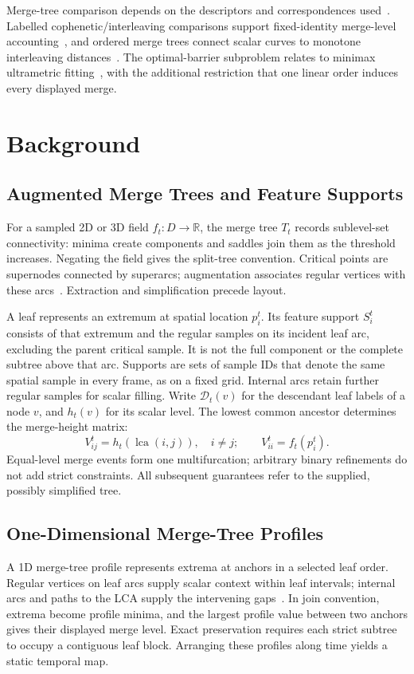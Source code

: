 \documentclass[review]{vgtc}
\newcommand{\lca}{\operatorname{lca}}
\begin{document}
Merge-tree comparison depends on the descriptors and correspondences used~\cite{Yan:2021:Survey}. Labelled cophenetic/interleaving comparisons support fixed-identity merge-level accounting~\cite{Munch:2019:LINF,Gasparovic:2024:IID}, and ordered merge trees connect scalar curves to monotone interleaving distances~\cite{Beurskens:2025:OMT}. The optimal-barrier subproblem relates to minimax ultrametric fitting~\cite{Farach:1995:RM}, with the additional restriction that one linear order induces every displayed merge.

\section{Background}\label{sec:background}
\subsection{Augmented Merge Trees and Feature Supports}
For a sampled 2D or 3D field $f_t:D\to\mathbb{R}$, the merge tree $T_t$ records sublevel-set connectivity: minima create components and saddles join them as the threshold increases. Negating the field gives the split-tree convention. Critical points are supernodes connected by superarcs; augmentation associates regular vertices with these arcs~\cite{Koepp:2023:TMTM,STMTM:2026,Tierny:2018:TTK}. Extraction and simplification precede layout.

A leaf represents an extremum at spatial location $p_i^t$. Its feature support $S_i^t$ consists of that extremum and the regular samples on its incident leaf arc, excluding the parent critical sample. It is not the full component or the complete subtree above that arc. Supports are sets of sample IDs that denote the same spatial sample in every frame, as on a fixed grid. Internal arcs retain further regular samples for scalar filling. Write $\mathcal{D}_t(v)$ for the descendant leaf labels of a node $v$, and $h_t(v)$ for its scalar level. The lowest common ancestor determines the merge-height matrix:
\begin{equation}\label{eq:merge}
 V_{ij}^t=h_t(\lca(i,j)),\quad i\ne j;\qquad
 V_{ii}^t=f_t(p_i^t).
\end{equation}
Equal-level merge events form one multifurcation; arbitrary binary refinements do not add strict constraints. All subsequent guarantees refer to the supplied, possibly simplified tree.

\subsection{One-Dimensional Merge-Tree Profiles}
A 1D merge-tree profile represents extrema at anchors in a selected leaf order. Regular vertices on leaf arcs supply scalar context within leaf intervals; internal arcs and paths to the LCA supply the intervening gaps~\cite{Koepp:2023:TMTM,STMTM:2026}. In join convention, extrema become profile minima, and the largest profile value between two anchors gives their displayed merge level. Exact preservation requires each strict subtree to occupy a contiguous leaf block. Arranging these profiles along time yields a static temporal map.
\end{document}
